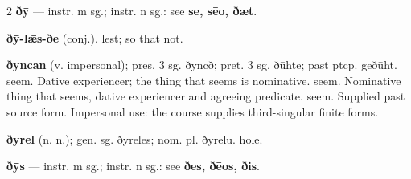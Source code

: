 \begin{multicols*}{2}
\textbf{ðȳ} — instr. m sg.; instr. n sg.: see \textbf{se, sēo, ðæt}.\par
\textbf{ðȳ-lǣs-ðe} (conj.). lest; so that not.\par
\textbf{ðyncan} (v. impersonal); pres. 3 sg. ðyncð; pret. 3 sg. ðūhte; past ptcp. geðūht. seem. Dative experiencer; the thing that seems is nominative. seem. Nominative thing that seems, dative experiencer and agreeing predicate. seem. Supplied past source form. Impersonal use: the course supplies third-singular finite forms.\par
\textbf{ðyrel} (n. n.); gen. sg. ðyreles; nom. pl. ðyrelu. hole.\par
\textbf{ðȳs} — instr. m sg.; instr. n sg.: see \textbf{ðes, ðēos, ðis}.\par

\end{multicols*}
